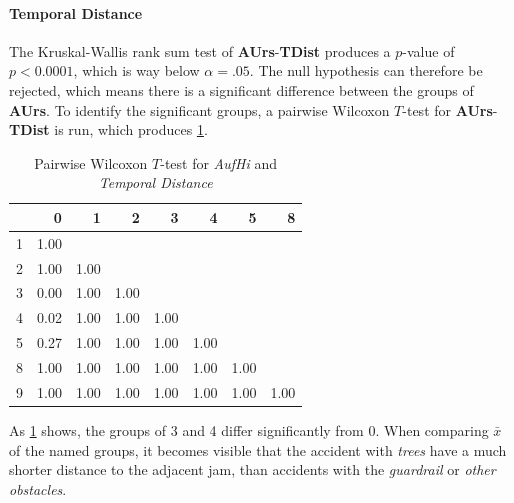 \paragraph{Temporal Distance}

The Kruskal-Wallis rank sum test of \textbf{AUrs}-\textbf{TDist} produces a $p$-value of $p < 
0.0001$, which is way below $\alpha=.05$. The null hypothesis can therefore be rejected, which means there is a significant difference between the groups of \textbf{AUrs}. To identify the significant groups, a pairwise Wilcoxon $T$-test for \textbf{AUrs}-\textbf{TDist} is run, which produces \cref{tbl:wilcoxon_baysis_matched_AufHi_TDist}.
\begin{table}[ht]
	\tiny
	\centering
    \begin{tabular}{rrrrrrrr}
        \toprule
        & 0 & 1 & 2 & 3 & 4 & 5 & 8 \\ 
        \midrule
        1 & 1.00 &  &  &  &  &  &  \\ 
        2 & 1.00 & 1.00 &  &  &  &  &  \\ 
        3 & 0.00 & 1.00 & 1.00 &  &  &  &  \\ 
        4 & 0.02 & 1.00 & 1.00 & 1.00 &  &  &  \\ 
        5 & 0.27 & 1.00 & 1.00 & 1.00 & 1.00 &  &  \\ 
        8 & 1.00 & 1.00 & 1.00 & 1.00 & 1.00 & 1.00 &  \\ 
        9 & 1.00 & 1.00 & 1.00 & 1.00 & 1.00 & 1.00 & 1.00 \\ 
        \bottomrule
      \end{tabular}
	\caption{Pairwise Wilcoxon $T$-test for \textit{AufHi} and \textit{Temporal Distance}}
	\label{tbl:wilcoxon_baysis_matched_AufHi_TDist}
\end{table}
As \cref{tbl:wilcoxon_baysis_matched_AufHi_TDist} shows, the groups of 3 and 4 differ significantly from 0. When comparing $\bar{x}$ of the named groups, it becomes visible that the accident with \textit{trees} have a much shorter distance to the adjacent jam, than accidents with the \textit{guardrail} or \textit{other obstacles}.
